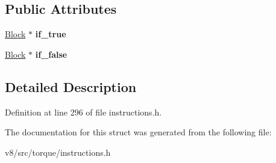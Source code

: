 \subsection*{Public Attributes}
\begin{DoxyCompactItemize}
\item 
\mbox{\label{structv8_1_1internal_1_1torque_1_1BranchInstruction_a1b74306ca2d7a2c68508b0f699d96c09}} 
\mbox{\hyperlink{classv8_1_1internal_1_1torque_1_1Block}{Block}} $\ast$ {\bfseries if\+\_\+true}
\item 
\mbox{\label{structv8_1_1internal_1_1torque_1_1BranchInstruction_a5a3515c2c29cf9ba0344e74327ceebeb}} 
\mbox{\hyperlink{classv8_1_1internal_1_1torque_1_1Block}{Block}} $\ast$ {\bfseries if\+\_\+false}
\end{DoxyCompactItemize}


\subsection{Detailed Description}


Definition at line 296 of file instructions.\+h.



The documentation for this struct was generated from the following file\+:\begin{DoxyCompactItemize}
\item 
v8/src/torque/instructions.\+h\end{DoxyCompactItemize}
